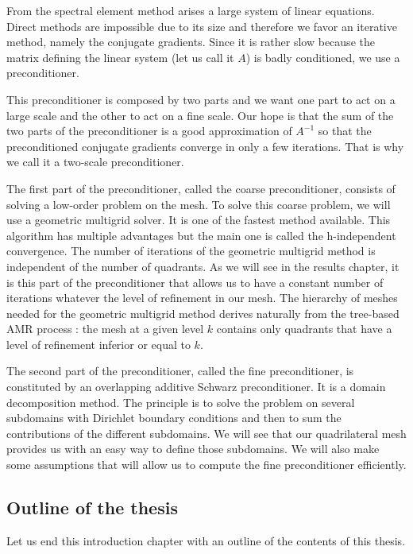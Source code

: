 From the spectral element method arises a large system of linear equations. Direct methods are impossible due to its size and therefore we favor an iterative method, namely the conjugate gradients. Since it is rather slow because the matrix defining the linear system (let us call it $A$) is badly conditioned, we use a preconditioner. 

This preconditioner is composed by two parts and we want one part to act on a large scale and the other to act on a fine scale. Our hope is that the sum of the two parts of the preconditioner is a good approximation of $A^{-1}$ so that the preconditioned conjugate gradients converge in only a few iterations. That is why we call it a two-scale preconditioner.    

The first part of the preconditioner, called the coarse preconditioner, consists of solving a low-order problem on the mesh. To solve this coarse problem, we will use a geometric multigrid solver. It is one of the fastest method available. This algorithm has multiple advantages but the main one is called the h-independent convergence. The number of iterations of the geometric multigrid method is independent of the number of quadrants. As we will see in the results chapter, it is this part of the preconditioner that allows us to have a constant number of iterations whatever the level of refinement in our mesh. The hierarchy of meshes needed for the geometric multigrid method derives naturally from the tree-based AMR process : the mesh at a given level $k$ contains only quadrants that have a level of refinement inferior or equal to $k$.   

The second part of the preconditioner, called the fine preconditioner, is constituted by an overlapping additive Schwarz preconditioner. It is a domain decomposition method. The principle is to solve the problem on several subdomains with Dirichlet boundary conditions and then to sum the contributions of the different subdomains. We will see that our quadrilateral mesh provides us with an easy way to define those subdomains. We will also make some assumptions that will allow us to compute the fine preconditioner efficiently.   

\subsection*{Outline of the thesis}

Let us end this introduction chapter with an outline of the contents of this thesis. 

